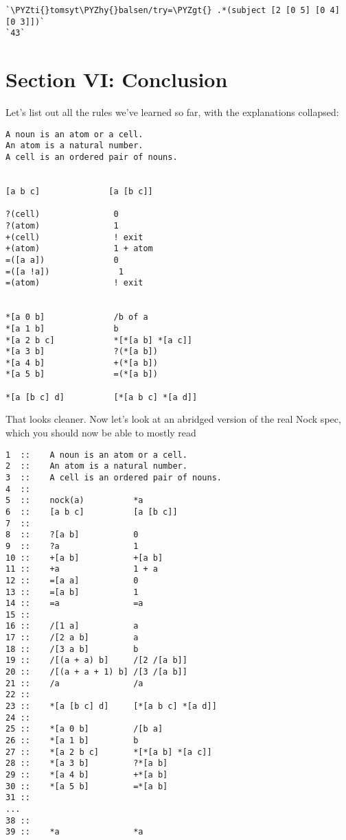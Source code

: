\begin{framed_shaded}
\begin{Verbatim}[fontsize=\relsize{-2.5},fontseries=b,commandchars=\\\{\}]
`\PYZti{}tomsyt\PYZhy{}balsen/try=\PYZgt{} .*(subject [2 [0 5] [0 4] [0 3]])`
`43`
\end{Verbatim}
\end{framed_shaded}

\section{Section VI: Conclusion}

Let's list out all the rules we've learned so far, with the explanations collapsed:

\begin{framed_shaded}
\begin{Verbatim}[fontsize=\relsize{-2.5},fontseries=b,commandchars=\\\{\}]
A noun is an atom or a cell.  
An atom is a natural number.  
A cell is an ordered pair of nouns. 
 

[a b c]              [a [b c]]

?(cell)               0
?(atom)               1
+(cell)               ! exit
+(atom)               1 + atom
=([a a])              0 
=([a !a])              1
=(atom)               ! exit


*[a 0 b]              /b of a
*[a 1 b]              b 
*[a 2 b c]            *[*[a b] *[a c]]
*[a 3 b]              ?(*[a b])
*[a 4 b]              +(*[a b])
*[a 5 b]              =(*[a b])

*[a [b c] d]          [*[a b c] *[a d]] 
\end{Verbatim}
\end{framed_shaded}
That looks cleaner. Now let's look at an abridged version of the real Nock spec, which you should now be able to mostly read

\begin{framed_shaded}
\begin{Verbatim}[fontsize=\relsize{-2.5},fontseries=b,commandchars=\\\{\}]
1  ::    A noun is an atom or a cell.
2  ::    An atom is a natural number.
3  ::    A cell is an ordered pair of nouns.
4  ::
5  ::    nock(a)          *a
6  ::    [a b c]          [a [b c]]
7  ::
8  ::    ?[a b]           0
9  ::    ?a               1
10 ::    +[a b]           +[a b]
11 ::    +a               1 + a
12 ::    =[a a]           0
13 ::    =[a b]           1
14 ::    =a               =a
15 ::
16 ::    /[1 a]           a
17 ::    /[2 a b]         a
18 ::    /[3 a b]         b
19 ::    /[(a + a) b]     /[2 /[a b]]
20 ::    /[(a + a + 1) b] /[3 /[a b]]
21 ::    /a               /a
22 ::
23 ::    *[a [b c] d]     [*[a b c] *[a d]]
24 ::
25 ::    *[a 0 b]         /[b a]
26 ::    *[a 1 b]         b
27 ::    *[a 2 b c]       *[*[a b] *[a c]]
28 ::    *[a 3 b]         ?*[a b]
29 ::    *[a 4 b]         +*[a b]
30 ::    *[a 5 b]         =*[a b]
31 ::
...
38 ::
39 ::    *a               *a
\end{Verbatim}
\end{framed_shaded}

